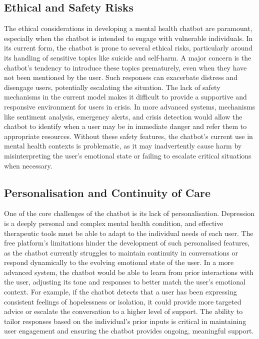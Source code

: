 \subsection*{Ethical and Safety Risks} 
The ethical considerations in developing a mental health chatbot are paramount, especially when the chatbot is intended to engage with vulnerable individuals. In its current form, the chatbot is prone to several ethical risks, particularly around its handling of sensitive topics like suicide and self-harm. A major concern is the chatbot’s tendency to introduce these topics prematurely, even when they have not been mentioned by the user. Such responses can exacerbate distress and disengage users, potentially escalating the situation.
The lack of safety mechanisms in the current model makes it difficult to provide a supportive and responsive environment for users in crisis. In more advanced systems, mechanisms like sentiment analysis, emergency alerts, and crisis detection would allow the chatbot to identify when a user may be in immediate danger and refer them to appropriate resources. Without these safety features, the chatbot’s current use in mental health contexts is problematic, as it may inadvertently cause harm by misinterpreting the user’s emotional state or failing to escalate critical situations when necessary.
\subsection*{Personalisation and Continuity of Care} 
One of the core challenges of the chatbot is its lack of personalisation. Depression is a deeply personal and complex mental health condition, and effective therapeutic tools must be able to adapt to the individual needs of each user. The free platform’s limitations hinder the development of such personalised features, as the chatbot currently struggles to maintain continuity in conversations or respond dynamically to the evolving emotional state of the user.
In a more advanced system, the chatbot would be able to learn from prior interactions with the user, adjusting its tone and responses to better match the user’s emotional context. For example, if the chatbot detects that a user has been expressing consistent feelings of hopelessness or isolation, it could provide more targeted advice or escalate the conversation to a higher level of support. The ability to tailor responses based on the individual’s prior inputs is critical in maintaining user engagement and ensuring the chatbot provides ongoing, meaningful support.
